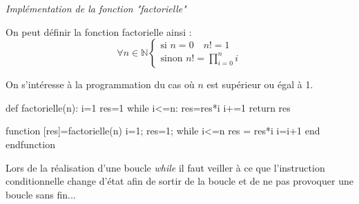 \documentclass[11pt,oneside]{article}
\begin{document}
\begin{exemple}
\textit{Implémentation de la fonction "factorielle"}

On peut définir la fonction factorielle ainsi : 
$$
\forall  n\in \mathbb{N}
\left\{
\begin{array}{l}
\text{si } n=0 \quad n!=1\\
\text{sinon } n !=\prod\limits_{i=0}^n i
\end{array}
\right.
$$
 
On s'intéresse à la programmation du cas où $n$ est supérieur ou égal à 1.

\begin{minipage}[c]{.3\linewidth}
\begin{pseudo}
\begin{algorithm}[H]
\end{algorithm}
\end{pseudo}
\end{minipage}\hfill
\begin{minipage}[c]{.3\linewidth}
\begin{py}
\begin{python}
def factorielle(n):
        i=1    
        res=1
        while i<=n:
            res=res*i
            i+=1
        return res
\end{python}
\end{py}
\end{minipage}\hfill
\begin{minipage}[c]{.3\linewidth}
\begin{sci}
\begin{scilab}
function [res]=factorielle(n)
  i=1;
  res=1;
  while i<=n
    res = res*i
    i=i+1
  end
endfunction
\end{scilab}
\end{sci}
\end{minipage}

\end{exemple}



\begin{warn}
Lors de la réalisation d'une boucle \textsl{while} il faut veiller à ce que l'instruction conditionnelle change d'état afin de sortir de la boucle et de ne pas provoquer une boucle sans fin...
\end{warn}
\end{document}
